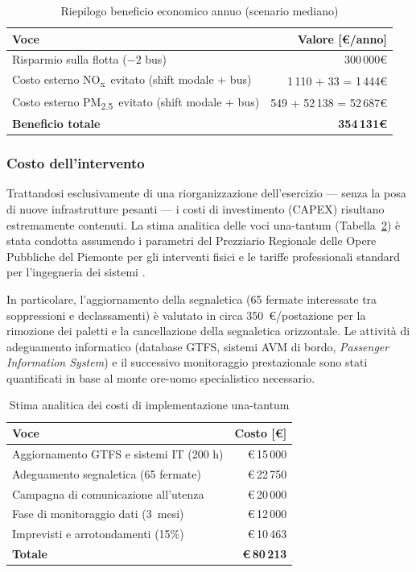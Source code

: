 \documentclass[conference]{IEEEtran}
\newcommand{\nox}{NO\textsubscript{x}}
\newcommand{\pmtwo}{PM\textsubscript{2.5}}
\begin{document}
\begin{table}[H]
\caption{Riepilogo beneficio economico annuo (scenario mediano)}
\label{tab:economics}
\centering
\renewcommand{\arraystretch}{1.15}
\begin{tabular}{@{}lr@{}}
\toprule
Voce & Valore [\euro{}/anno] \\
\midrule
Risparmio sulla flotta ($-2$ bus)  & 300\,000\euro{} \\
Costo esterno \nox\ evitato (shift modale + bus)       & 1\,110 + 33 = 1\,444\euro{} \\
Costo esterno \pmtwo\ evitato (shift modale + bus)     & 549 + 52\,138 = 52\,687\euro{} \\
\midrule
\textbf{Beneficio totale}          & \textbf{{}354\,131\euro} \\
\bottomrule
\end{tabular}
\end{table}

\subsubsection{Costo dell'intervento}
Trattandosi esclusivamente di una riorganizzazione dell'esercizio --- senza la posa di nuove infrastrutture pesanti --- i costi di investimento (CAPEX) risultano estremamente contenuti. La stima analitica delle voci una-tantum (Tabella~\ref{tab:cost}) è stata condotta assumendo i parametri del Prezziario Regionale delle Opere Pubbliche del Piemonte per gli interventi fisici \cite{prezziario_piemonte} e le tariffe professionali standard per l'ingegneria dei sistemi \cite{oice_tariffe}.

In particolare, l'aggiornamento della segnaletica (65 fermate interessate tra soppressioni e declassamenti) è valutato in circa \SI{350}{\euro}/postazione per la rimozione dei paletti e la cancellazione della segnaletica orizzontale. Le attività di adeguamento informatico (database GTFS, sistemi AVM di bordo, \textit{Passenger Information System}) e il successivo monitoraggio prestazionale sono stati quantificati in base al monte ore-uomo specialistico necessario.

\begin{table}[htbp]
\caption{Stima analitica dei costi di implementazione una-tantum}
\label{tab:cost}
\centering
\renewcommand{\arraystretch}{1.15}
\begin{tabular}{@{}lr@{}}
\toprule
Voce & Costo [\euro] \\
\midrule
Aggiornamento GTFS e sistemi IT (200 h) & \euro\,15\,000 \\
Adeguamento segnaletica (65 fermate) & \euro\,22\,750 \\
Campagna di comunicazione all'utenza    & \euro\,20\,000 \\
Fase di monitoraggio dati (3~mesi)      & \euro\,12\,000 \\
Imprevisti e arrotondamenti (15\%)      & \euro\,10\,463 \\
\midrule
\textbf{Totale}                         & \textbf{\euro\,80\,213} \\
\bottomrule
\end{tabular}
\end{table}
\end{document}
